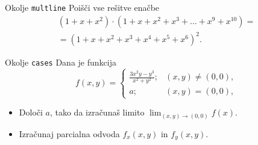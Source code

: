 \begin{frame}{Okolje \texttt{multline}}
	Poišči vse rešitve enačbe
	\begin{multline}
	(1+x+x^2) \cdot (1+x+x^2+x^3+\ldots+x^9+x^{10}) =\\ 
	=(1+x+x^2+x^3+x^4+x^5+x^6)^2.
	\end{multline}
\end{frame}

\begin{frame}{Okolje \texttt{cases}}
	Dana je funkcija
	\[
		f(x,y)= 
	\begin{cases}
		\frac{3x^2y-y^3}{x^2+y^2}; &(x,y) \neq (0,0),\\
		a; &(x,y) = (0,0),
	\end{cases}
	\]
	\begin{itemize}
	\item Določi $a$, tako da izračunaš limito \( \lim_{(x,y)\to(0,0)} f(x). \)
	\item Izračunaj parcialna odvoda $f_x(x,y)$ in $f_y(x,y)$.
	\end{itemize}
\end{frame}
